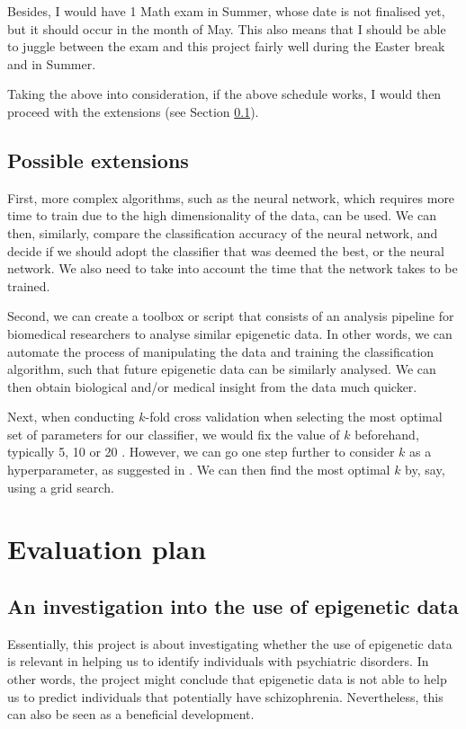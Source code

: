\documentclass[12pt, twoside, a4paper]{article}
\begin{document}
Besides, I would have 1 Math exam in Summer, whose date is not finalised yet, but it should occur in the month of May. This also means that I should be able to juggle between the exam and this project fairly well during the Easter break and in Summer.

Taking the above into consideration, if the above schedule works, I would then proceed with the extensions (see Section \ref{extensions}).

\subsection{Possible extensions} \label{extensions}
First, more complex algorithms, such as the neural network, which requires more time to train due to the high dimensionality of the data, can be used. We can then, similarly, compare the classification accuracy of the neural network, and decide if we should adopt the classifier that was deemed the best, or the neural network. We also need to take into account the time that the network takes to be trained.

Second, we can create a toolbox or script that consists of an analysis pipeline for biomedical researchers to analyse similar epigenetic data. In other words, we can automate the process of manipulating the data and training the classification algorithm, such that future epigenetic data can be similarly analysed. We can then obtain biological and/or medical insight from the data much quicker.

Next, when conducting $k$-fold cross validation when selecting the most optimal set of parameters for our classifier, we would fix the value of $k$ beforehand, typically 5, 10 or 20 \cite{RefWorks:116}. However, we can go one step further to consider $k$ as a hyperparameter, as suggested in \cite{RefWorks:116}. We can then find the most optimal $k$ by, say, using a grid search.

\section{Evaluation plan}
\subsection{An investigation into the use of epigenetic data}
Essentially, this project is about investigating whether the use of epigenetic data is relevant in helping us to identify individuals with psychiatric disorders. In other words, the project might conclude that epigenetic data is not able to help us to predict individuals that potentially have schizophrenia. Nevertheless, this can also be seen as a beneficial development.
\end{document}

